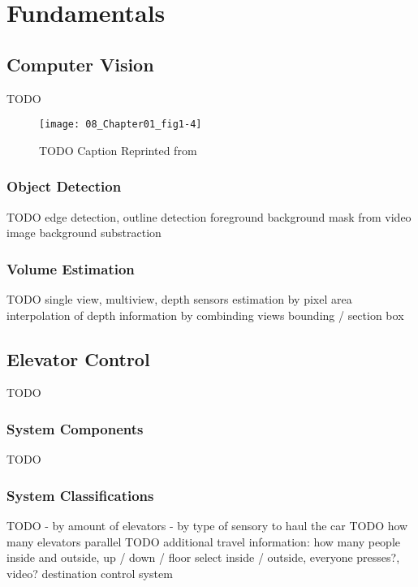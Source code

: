 \chapter{Fundamentals}
\label{chap:sota}

\section{Computer Vision}

TODO

\begin{figure}
	\centering
	\texttt{[image: 08\_Chapter01\_fig1-4]}
	\caption[]{\label{fig:sota:imageengineering} TODO Caption
	Reprinted from \textcite[][Chapter~1]{zhang2017imageprocessing}}
\end{figure}

\subsection{Object Detection}

TODO
edge detection, outline detection
foreground background mask from video image
background substraction

\subsection{Volume Estimation}

TODO
single view, multiview, depth sensors
estimation by pixel area
interpolation of depth information by combinding views
bounding / section box

\section{Elevator Control}
TODO

\subsection{System Components}
TODO

\subsection{System Classifications}
TODO
- by amount of elevators
- by type of sensory to haul the car
TODO how many elevators parallel
TODO additional travel information: how many people inside and outside, up / down / floor select inside / outside, everyone presses?, video? 
destination control system

